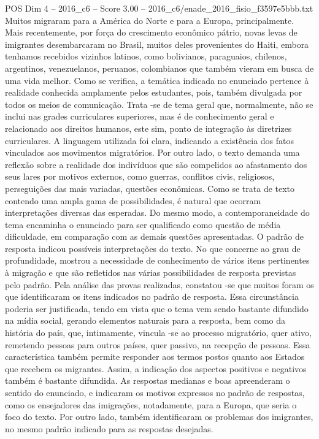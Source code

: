 \begin{textsample}{POS Dim 4 – 2016\_c6 – Score 3.00 – 2016\_c6/enade\_2016\_fisio\_f3597e5bbb.txt}
Muitos migraram para a América do Norte e para a Europa, principalmente.
Mais recentemente, por força do crescimento econômico pátrio, novas levas de imigrantes desembarcaram no Brasil, muitos deles provenientes do Haiti, embora tenhamos recebidos vizinhos latinos, como bolivianos, paraguaios, chilenos, argentinos, venezuelanos, peruanos, colombianos que também vieram em busca de uma vida melhor.
Como se verifica, a temática indicada no enunciado pertence à realidade conhecida amplamente pelos estudantes, pois, também divulgada por todos os meios de comunicação.
Trata -se de tema geral que, normalmente, não se inclui nas grades curriculares superiores, mas é de conhecimento geral e relacionado aos direitos humanos, este sim, ponto de integração às diretrizes curriculares.
A linguagem utilizada foi clara, indicando a existência dos fatos vinculados aos movimentos migratórios.
Por outro lado, o texto demanda uma reflexão sobre a realidade dos indivíduos que são compelidos ao afastamento dos seus lares por motivos externos, como guerras, conflitos civis, religiosos, perseguições das mais variadas, questões econômicas.
Como se trata de texto contendo uma ampla gama de possibilidades, é natural que ocorram interpretações diversas das esperadas.
Do mesmo modo, a contemporaneidade do tema encaminha o enunciado para ser qualificado como questão de média dificuldade, em comparação com as demais questões apresentadas.
O padrão de resposta indicou possíveis interpretações do texto.
No que concerne ao grau de profundidade, mostrou a necessidade de conhecimento de vários itens pertinentes à migração e que são refletidos nas várias possibilidades de resposta previstas pelo padrão.
Pela análise das provas realizadas, constatou -se que muitos foram os que identificaram os itens indicados no padrão de resposta.
Essa circunstância poderia ser justificada, tendo em vista que o tema vem sendo bastante difundido na mídia social, gerando elementos naturais para a resposta, bem como da história do país, que, intimamente, vincula -se ao processo migratório, quer ativo, remetendo pessoas para outros países, quer passivo, na recepção de pessoas.
Essa característica também permite responder aos termos postos quanto aos Estados que recebem os migrantes.
Assim, a indicação dos aspectos positivos e negativos também é bastante difundida.
As respostas medianas e boas apreenderam o sentido do enunciado, e indicaram os motivos expressos no padrão de respostas, como os ensejadores das imigrações, notadamente, para a Europa, que seria o foco do texto.
Por outro lado, também identificaram os problemas dos imigrantes, no mesmo padrão indicado para as respostas desejadas.

\end{textsample}
